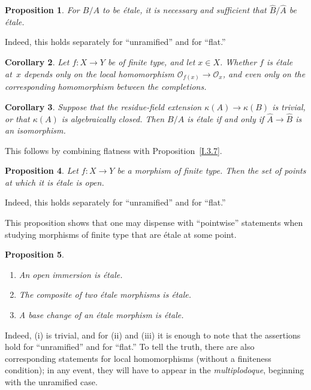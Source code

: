 \documentclass[11pt,oneside]{amsbook}
\newtheorem{proposition}{Proposition}[section]
\newtheorem{corollary}[proposition]{Corollary}
\begin{document}
\begin{proposition}
\label{I.4.2}
For \(B/A\) to be étale, it is necessary and sufficient that
\(\widehat B/\widehat A\) be étale.
\end{proposition}

Indeed, this holds separately for ``unramified'' and for ``flat.''

\begin{corollary}
\label{I.4.3}
Let \(f\colon X\to Y\) be of finite type, and let \(x\in X\).  Whether
\(f\) is étale at~\(x\) depends only on the local homomorphism
\(\mathcal O_{f(x)}\to\mathcal O_x\), and even only on the corresponding
homomorphism between the completions.
\end{corollary}

\begin{corollary}
\label{I.4.4}
Suppose that the residue-field extension
\(\kappa(A)\to\kappa(B)\) is trivial, or that \(\kappa(A)\) is
algebraically closed.  Then \(B/A\) is étale if and only if
\(\widehat A\to\widehat B\) is an isomorphism.
\end{corollary}

This follows by combining flatness with Proposition~\ref{I.3.7}.

\begin{proposition}
\label{I.4.5}
Let \(f\colon X\to Y\) be a morphism of finite type.  Then the set of
points at which it is étale is open.
\end{proposition}

Indeed, this holds separately for ``unramified'' and for ``flat.''

This proposition shows that one may dispense with ``pointwise'' statements
when studying morphisms of finite type that are étale at some point.

\begin{proposition}
\label{I.4.6}
\begin{enumerate}
\item[(i)] An open immersion is étale.
\item[(ii)] The composite of two étale morphisms is étale.
\item[(iii)] A base change of an étale morphism is étale.
\end{enumerate}
\end{proposition}

%
Indeed, \textup{(i)} is trivial, and for \textup{(ii)} and \textup{(iii)}
it is enough to note that the assertions hold for ``unramified'' and for
``flat.''  To tell the truth, there are also corresponding statements for
local homomorphisms (without a finiteness condition); in any event, they will
have to appear in the \emph{multiplodoque}, beginning with the unramified
case.
\end{document}
